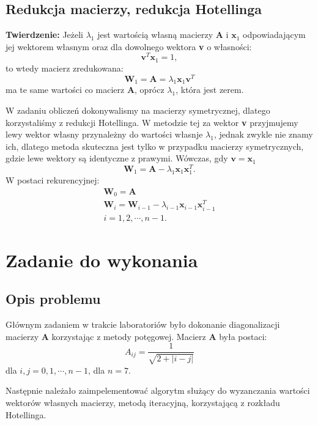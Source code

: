 \documentclass{article}
\begin{document}
\subsection{Redukcja macierzy, redukcja Hotellinga}
\textbf{Twierdzenie:} Jeżeli $\lambda_1$ jest wartością własną macierzy \textbf{A} i $\textbf{x}_1$ odpowiadającym jej wektorem własnym oraz dla dowolnego wektora \textbf{v} o własności:
\begin{equation}
\textbf{v}^T \textbf{x}_1 = 1,
\end{equation}
to wtedy macierz zredukowana:
\begin{equation}
\textbf{W}_1 = \textbf{A} = \lambda_1 \textbf{x}_1 \textbf{v}^T
\end{equation}
ma te same wartości co macierz \textbf{A}, oprócz $\lambda_1$, która jest zerem.
\par W zadaniu obliczeń dokonywalismy na macierzy symetrycznej, dlatego korzystaliśmy z redukcji Hotellinga. W metodzie tej za wektor \textbf{v} przyjmujemy lewy wektor własny przynależny do wartości własnje $\lambda_1$, jednak zwykle nie znamy ich, dlatego metoda skuteczna jest tylko w przypadku macierzy symetrycznych, gdzie lewe wektory są identyczne z prawymi. Wówczas, gdy $\textbf{v} = \textbf{x}_1$
\begin{equation}
\textbf{W}_1 = \textbf{A} - \lambda_1 \textbf{x}_1 \textbf{x}_1 ^T .
\end{equation}
W postaci rekurencyjnej:
\begin{equation}
\begin{array}{c}
	\textbf{W}_0 = \textbf{A} \\
	\textbf{W}_i = \textbf{W}_{i-1} - \lambda_{i-1} \textbf{x}_{i-1} \textbf{x}_{i-1} ^T \\
	i = 1,2, \cdots, n-1.
\end{array}
\end{equation}

\section{Zadanie do wykonania}
\subsection{Opis problemu}
Głównym zadaniem w trakcie laboratoriów było dokonanie diagonalizacji macierzy \textbf{A} korzystając z metody potęgowej. Macierz \textbf{A} była postaci:
\begin{equation}
A_{ij} = \frac{1}{\sqrt{2 + |i - j|}}
\end{equation}
dla $i,j = 0,1, \cdots , n-1$, dla $n = 7$. 
\par Następnie należało zaimpelementować algorytm służący do wyzanczania wartości wektorów własnych macierzy, metodą iteracyjną, korzystającą z rozkładu Hotellinga. 
\end{document}
